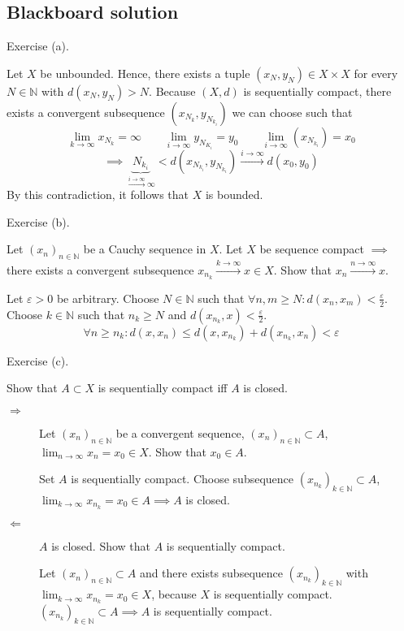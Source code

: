 \documentclass{article}
\begin{document}
\subsection{Blackboard solution}

Exercise (a).

Let $X$ be unbounded. Hence, there exists a tuple $(x_N, y_N) \in X \times X$ for every $N \in \mathbb N$ with $d(x_N, y_N) > N$.
Because $(X, d)$ is sequentially compact, there exists a convergent subsequence $(x_{N_k}, y_{N_{k_i}})$ we can choose such that
\[ \lim_{k\to\infty} x_{N_k} = \infty \qquad \lim_{i\to\infty} y_{N_{K_i}} = y_0 \qquad \lim_{i\to\infty} (x_{N_{k_i}}) = x_0 \]
\[ \implies \underbrace{N_{k_i}}_{\xrightarrow{i\to\infty} \infty} < d(x_{N_{k_i}}, y_{N_{k_i}}) \xrightarrow{i\to\infty} d(x_0, y_0) \]
By this contradiction, it follows that $X$ is bounded.

Exercise (b).

Let $(x_n)_{n\in\mathbb N}$ be a Cauchy sequence in $X$. Let $X$ be sequence compact $\implies$ there exists a convergent subsequence $x_{n_{k}} \xrightarrow{k\to\infty} x \in X$. Show that $x_n \xrightarrow{n\to\infty} x$.

Let $\varepsilon > 0$ be arbitrary. Choose $N \in \mathbb N$ such that $\forall n,m \geq N: d(x_n, x_m) < \frac\varepsilon2$.
Choose $k \in \mathbb N$ such that $n_k \geq N$ and $d(x_{n_k}, x) < \frac\varepsilon2$.
\[ \forall n \geq n_k: d(x, x_n) \leq d(x, x_{n_k}) + d(x_{n_k}, x_n) < \varepsilon \]

Exercise (c).

Show that $A \subset X$ is sequentially compact iff $A$ is closed.

\begin{description}
  \item[$\Rightarrow$]
    Let $(x_n)_{n \in \mathbb N}$ be a convergent sequence, $(x_n)_{n \in \mathbb N} \subset A$, $\lim_{n\to\infty} x_n = x_0 \in X$.
    Show that $x_0 \in A$.

    Set $A$ is sequentially compact. Choose subsequence $(x_{n_k})_{k \in \mathbb N} \subset A$, $\lim_{k\to\infty} x_{n_k} = x_0 \in A \implies A$ is closed.
  \item[$\Leftarrow$]
    $A$ is closed. Show that $A$ is sequentially compact.

    Let $(x_n)_{n\in\mathbb N} \subset A$ and there exists subsequence $(x_{n_k})_{k \in \mathbb N}$ with $\lim_{k\to\infty} x_{n_k} = x_0 \in X$, because $X$ is sequentially compact.
    $(x_{n_k})_{k \in \mathbb N} \subset A \implies A$ is sequentially compact.
\end{description}
\end{document}
